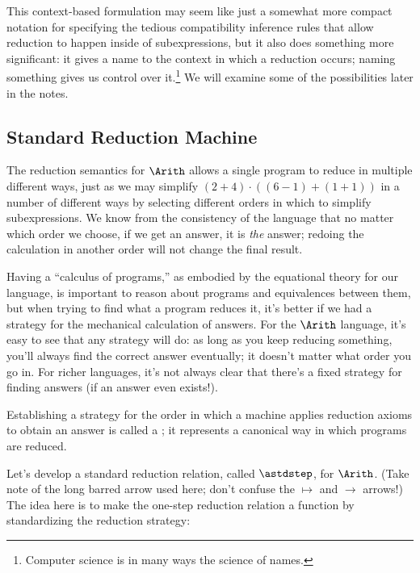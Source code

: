 This context-based formulation may seem like just a somewhat more
compact notation for specifying the tedious compatibility inference
rules that allow reduction to happen inside of subexpressions, but it
also does something more significant: it gives a name to the context in
which a reduction occurs; naming something gives us control over
it.\footnote{Computer science is in many ways the science of names.}
We will examine some of the possibilities later in the notes.


\subsection{Standard Reduction Machine}

The reduction semantics for $\Arith$ allows a single program to reduce
in multiple different ways, just as we may simplify
$(2+4)\cdot((6-1)+(1+1))$ in a number of different ways by selecting
different orders in which to simplify subexpressions. We know from the
consistency of the language that no matter which order we choose, if
we get an answer, it is \emph{the} answer; redoing the calculation in
another order will not change the final result.

Having a ``calculus of programs,'' as embodied by the equational
theory for our language, is important to reason about programs and
equivalences between them, but when trying to find what a program
reduces it, it's better if we had a strategy for the mechanical
calculation of answers.  For the $\Arith$ language, it's easy to see
that any strategy will do: as long as you keep reducing something,
you'll always find the correct answer eventually; it doesn't matter
what order you go in.  For richer languages, it's not always clear
that there's a fixed strategy for finding answers (if an answer even
exists!).


Establishing a strategy for the order in which a machine applies
reduction axioms to obtain an answer is called a ; it represents a canonical way in which programs
are reduced.




Let's develop a standard reduction relation, called $\astdstep$, for
$\Arith$.  (Take note of the long barred arrow used here; don't
confuse the $\longmapsto$ and $\rightarrow$ arrows!) The idea here is
to make the one-step reduction relation a function by standardizing
the reduction strategy:

